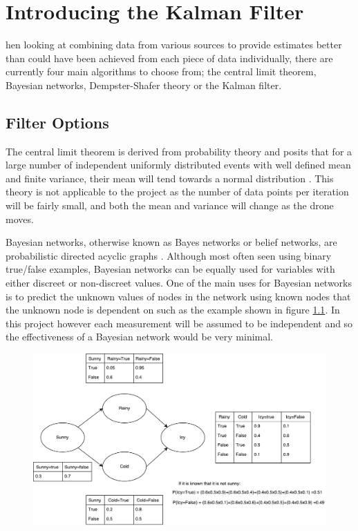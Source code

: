 \let\textcircled=\pgftextcircled
\chapter{Introducing the Kalman Filter}
\label{chap:introkalmanfilter}

hen looking at combining data from various sources to provide estimates better than could have been achieved from each piece of data individually, there are currently four main algorithms to choose from; the central limit theorem, Bayesian networks, Dempster-Shafer theory or the Kalman filter.\par


\section{Filter Options}
\label{sec:choosingafilter}
	The central limit theorem is derived from probability theory and posits that for a large number of independent uniformly distributed events with well defined mean and finite variance, their mean will tend towards a normal distribution \cite{rice2006mathematical}. This theory is not applicable to the project as the number of data points per iteration will be fairly small, and both the mean and variance will change as the drone moves.\par
    Bayesian networks, otherwise known as Bayes networks or belief networks, are probabilistic directed acyclic graphs \cite{charniak1991bayesian}. Although most often seen using binary true/false examples, Bayesian networks can be equally used for variables with either discreet or non-discreet values. One of the main uses for Bayesian networks is to predict the unknown values of nodes in the network using known nodes that the unknown node is dependent on such as the example shown in figure \ref{fig:BayesianNetwork}. In this project however each measurement will be assumed to be independent and so the effectiveness of a Bayesian network would be very minimal.\par
\begin{figure}[t!]
	\centering
	\includegraphics[height=0.45\textheight]{BayesianNetwork.pdf}
	\label{fig:BayesianNetwork}
\end{figure}
